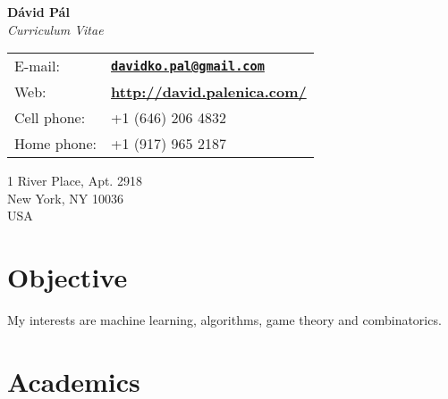 \documentclass[9pt]{article}
\begin{document}
\begin{center}
{\huge \textbf{D\'avid P\'al}} \\[0.2cm]
\emph{Curriculum Vitae}
\end{center}

\vspace{0.2cm}

%
\noindent
%
\begin{minipage}{10cm}
\begin{tabular}{@{}ll}
E-mail:      & \href{mailto:davidko.pal@gmail.com}{\textbf{\texttt{davidko.pal@gmail.com}}} \\[0.1cm]
Web:         & \textbf{\url{http://david.palenica.com/}} \\[0.1cm]
Cell phone:  & +1 (646) 206 4832 \\[0.1cm]
Home phone:  & +1 (917) 965 2187 \\[0.1cm]
\end{tabular}
\end{minipage}
%
\begin{minipage}{10cm}
1 River Place, Apt. 2918 \\
New York, NY 10036 \\
USA \\
\end{minipage}


\section*{Objective}
My interests are machine learning, algorithms, game theory and combinatorics.

\section*{Academics}
\end{document}
